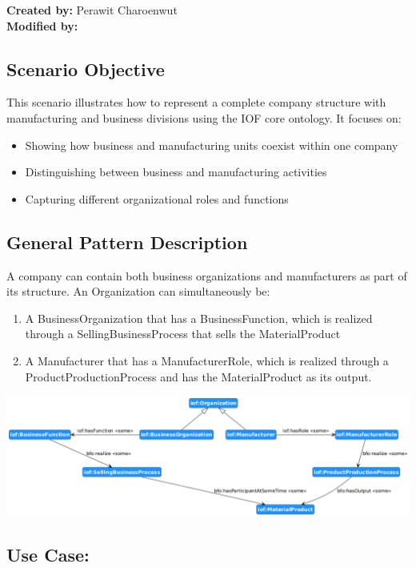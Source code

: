 \label{chapter-scenario-template}
\textbf{Created by:} Perawit Charoenwut \\
\textbf{Modified by:}

\subsection*{Scenario Objective}
This scenario illustrates how to represent a complete company structure with manufacturing and business divisions using the IOF core ontology. It focuses on:
\begin{itemize}
    \item Showing how business and manufacturing units coexist within one company
    \item Distinguishing between business and manufacturing activities
    \item Capturing different organizational roles and functions
\end{itemize}

\subsection*{General Pattern Description}
A company can contain both business organizations and manufacturers as part of its structure.
An Organization can simultaneously be:
\begin{enumerate}
    \item A BusinessOrganization that has a BusinessFunction, which is realized through a SellingBusinessProcess that sells the MaterialProduct
    \item A Manufacturer that has a ManufacturerRole, which is realized through a ProductProductionProcess and  has the MaterialProduct as its output.
\end{enumerate}

\includegraphics[scale=0.42]{scenarios/different-type-organizations/image/different-type-organizations-schema}

\subsection*{Use Case: }

